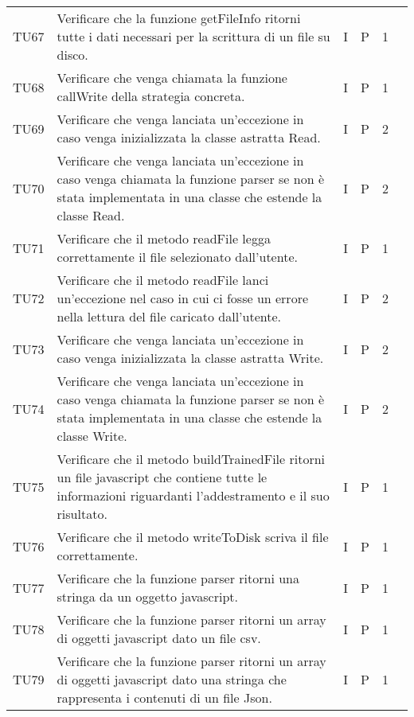 \begin{longtable} {
		>{}p{12mm}
		>{}p{79.5mm}
		>{}p{9mm}
		>{}p{8mm}
		>{}p{14mm}
		>{}p{0mm}}
	TU67		& Verificare che la funzione getFileInfo ritorni tutte i dati necessari per la scrittura di un file su disco. & I & P & 1 & \TBstrut \\ [2mm]
	TU68		& Verificare che venga chiamata la funzione callWrite della strategia concreta. & I & P & 1 & \TBstrut \\ [2mm]
	TU69		& Verificare che venga lanciata un'eccezione in caso venga inizializzata la classe astratta Read. & I & P & 2 & \TBstrut \\ [2mm]
	TU70		& Verificare che venga lanciata un'eccezione in caso venga chiamata la funzione parser se non è stata implementata in una classe che estende la classe Read. & I & P & 2 & \TBstrut \\ [2mm]
	TU71		& Verificare che il metodo readFile legga correttamente il file selezionato dall'utente. & I & P & 1 & \TBstrut \\ [2mm]
	TU72		& Verificare che il metodo readFile lanci un'eccezione nel caso in cui ci fosse un errore nella lettura del file caricato dall'utente. & I & P & 2 & \TBstrut \\ [2mm]
	TU73		& Verificare che venga lanciata un'eccezione in caso venga inizializzata la classe astratta Write. & I & P & 2 & \TBstrut \\ [2mm]
	TU74		& Verificare che venga lanciata un'eccezione in caso venga chiamata la funzione parser se non è stata implementata in una classe che estende la classe Write. & I & P & 2 & \TBstrut \\ [2mm]
	TU75		& Verificare che il metodo buildTrainedFile ritorni un file javascript che contiene tutte le informazioni riguardanti l'addestramento e il suo risultato. & I & P & 1 & \TBstrut \\ [2mm]
	TU76		& Verificare che il metodo writeToDisk scriva il file correttamente. & I & P & 1 & \TBstrut \\ [2mm]
	TU77		& Verificare che la funzione parser ritorni una stringa da un oggetto javascript. & I & P & 1 & \TBstrut \\ [2mm]
	TU78		& Verificare che la funzione parser ritorni un array di oggetti javascript dato un file csv. & I & P & 1 & \TBstrut \\ [2mm]
	TU79		& Verificare che la funzione parser ritorni un array di oggetti javascript dato una stringa che rappresenta i contenuti di un file Json. & I & P & 1 & \TBstrut \\ [2mm]

\end{longtable}
